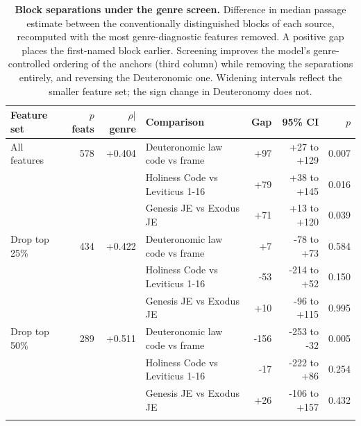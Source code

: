 \begin{table}[!ht]
\centering
\footnotesize
\caption{{\bf Block separations under the genre screen.}  Difference in median passage estimate between the conventionally distinguished blocks of each source, recomputed with the most genre-diagnostic features removed.  A positive gap places the first-named block earlier.  Screening improves the model's genre-controlled ordering of the anchors (third column) while removing the separations entirely, and reversing the Deuteronomic one.  Widening intervals reflect the smaller feature set; the sign change in Deuteronomy does not.}
\label{tab:s11}
\begin{tabular}{lrrlrrr}
\toprule
\textbf{Feature set} & \textbf{$p$ feats} & \textbf{$\rho|$genre} & \textbf{Comparison} & \textbf{Gap} & \textbf{95\% CI} & \textbf{$p$} \\
\midrule
All features & 578 & +0.404 & Deuteronomic law code vs frame & +97 & +27 to +129 & 0.007 \\
 & &  & Holiness Code vs Leviticus 1-16 & +79 & +38 to +145 & 0.016 \\
 & &  & Genesis JE vs Exodus JE & +71 & +13 to +120 & 0.039 \\
\addlinespace
Drop top 25\% & 434 & +0.422 & Deuteronomic law code vs frame & +7 & -78 to +73 & 0.584 \\
 & &  & Holiness Code vs Leviticus 1-16 & -53 & -214 to +52 & 0.150 \\
 & &  & Genesis JE vs Exodus JE & +10 & -96 to +115 & 0.995 \\
\addlinespace
Drop top 50\% & 289 & +0.511 & Deuteronomic law code vs frame & -156 & -253 to -32 & 0.005 \\
 & &  & Holiness Code vs Leviticus 1-16 & -17 & -222 to +86 & 0.254 \\
 & &  & Genesis JE vs Exodus JE & +26 & -106 to +157 & 0.432 \\
\addlinespace
\bottomrule
\end{tabular}
\end{table}
